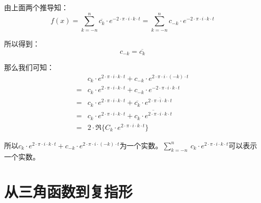 由上面两个推导知：
$$
	f(x)=\sum\limits_{k=-n}^n \overline{c_k}\cdot e^{-2\cdot \pi \cdot i \cdot k \cdot t}=\sum\limits_{k=-n}^n c_{-k}\cdot e^{-2\cdot \pi \cdot i \cdot k \cdot t}
$$


所以得到：
\begin{equation}
	c_{-k}=\overline{c_k}
\end{equation}

那么我们可知：
\begin{align*}
	  & c_k\cdot e^{2\cdot \pi\cdot i\cdot k\cdot t}+c_{-k}\cdot e^{2\cdot \pi\cdot i\cdot (-k)\cdot t}                 \\
	= & c_k\cdot e^{2\cdot \pi\cdot i\cdot k\cdot t}+c_{-k}\cdot e^{-2\cdot \pi\cdot i\cdot k\cdot t}                   \\
	= & c_k\cdot e^{2\cdot \pi\cdot i\cdot k\cdot t}+\overline{c_k}\cdot e^{\overline{2\cdot \pi\cdot i\cdot k\cdot t}} \\
	= & c_k\cdot e^{2\cdot \pi\cdot i\cdot k\cdot t}+\overline{c_k\cdot e^{2\cdot \pi\cdot i\cdot k\cdot t}}            \\
	= & 2\cdot \Re\{C_k\cdot e^{2\cdot \pi \cdot i\cdot k\cdot t}\}
\end{align*}

所以$c_k\cdot e^{2\cdot \pi\cdot i\cdot k\cdot t}+c_{-k}\cdot e^{2\cdot \pi\cdot i\cdot (-k)\cdot t}$为一个实数。$\sum\limits_{k=-n}^n\ c_k\cdot e^{2\cdot \pi \cdot i \cdot k \cdot t}$可以表示一个实数。

\section{从三角函数到复指形}
